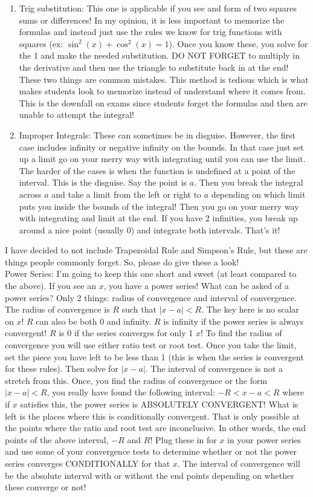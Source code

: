 \documentclass[10pt]{article}
\theoremstyle{Theorem}
\theoremstyle{definition}
\theoremstyle{remark}
\theoremstyle{custom}
\begin{document}
\begin{enumerate}[1.]
\item Trig substitution: This one is applicable if you see and form of two squares sums or differences! In my opinion, it is less important to memorize the formulas and instead just use the rules we know for trig functions with squares (ex: $\sin^2(x)+\cos^2(x)=1$). Once you know these, you solve for the 1 and make the needed substitution. DO NOT FORGET to multiply in the derivative and then use the triangle to substitute back in at the end! These two things are common mistakes. This method is tedious which is what makes students look to memorize instead of understand where it comes from. This is the downfall on exams since students forget the formulas and then are unable to attempt the integral!
\item Improper Integrals: These can sometimes be in disguise. However, the first case includes infinity or negative infinity on the bounds. In that case just set up a limit go on your merry way with integrating until you can use the limit. The harder of the cases is when the function is undefined at a point of the interval. This is the disguise. Say the point is $a$. Then you break the integral across $a$ and take a limit from the left or right to $a$ depending on which limit puts you inside the bounds of the integral! Then you go on your merry way with integrating and limit at the end. If you have 2 infinities, you break up around a nice point (usually 0) and integrate both intervals. That's it!
\end{enumerate}
I have decided to not include Trapezoidal Rule and Simpson's Rule, but these are things people commonly forget. So, please do give these a look!\\
Power Series: I'm going to keep this one short and sweet (at least compared to the above). If you see an $x$, you have a power series! What can be asked of a power series? Only 2 things: radius of convergence and interval of convergence. The radius of convergence is $R$ such that $|x-a|<R$. The key here is no scalar on $x$! $R$ can also be both 0 and infinity. $R$ is infinity if the power series is always convergent! $R$ is 0 if the series converges for only 1 $x$! To find the radius of convergence you will use either ratio test or root test. Once you take the limit, set the piece you have left to be less than 1 (this is when the series is convergent for these rules). Then solve for $|x-a|$. The interval of convergence is not a stretch from this. Once, you find the radius of convergence or the form $|x-a|<R$, you really have found the following interval: $-R<x-a<R$ where if $x$ satisfies this, the power series is ABSOLUTELY CONVERGENT! What is left is the places where this is conditionally convergent. That is only possible at the points where the ratio and root test are inconclusive. In other words, the end points of the above interval, $-R$ and $R$! Plug these in for $x$ in your power series and use some of your convergence tests to determine whether or not the power series converges CONDITIONALLY for that $x$. The interval of convergence will be the absolute interval with or without the end points depending on whether these converge or not! \\
\end{document}
